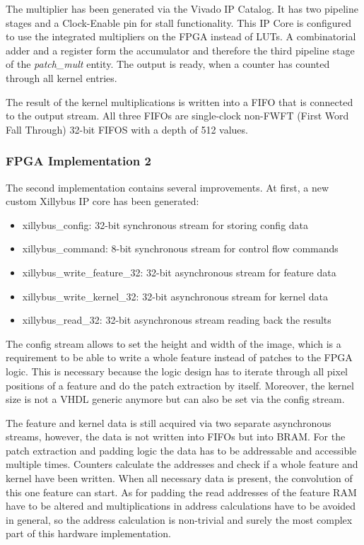 \documentclass[
			fontsize = 12pt,
			paper = a4
			]
			{scrartcl}%
\newcommand{\?}{\ensuremath{^\texttt{\textbf [CITATION~NEEDED]}}}
\begin{document}
The multiplier has been generated via the Vivado IP Catalog.
It has two pipeline stages and a Clock-Enable pin for stall functionality.
This IP Core is configured to use the integrated multipliers on the FPGA instead of LUTs.
A combinatorial adder and a register form the accumulator and therefore the third pipeline stage of the \emph{patch\_mult} entity.
The output is ready, when a counter has counted through all kernel entries.

The result of the kernel multiplications is written into a FIFO that is connected to the output stream.
All three FIFOs are single-clock non-FWFT (First Word Fall Through) 32-bit FIFOS with a depth of 512 values.

\subsubsection{FPGA Implementation 2}
\label{sec:fpgaimpl2}

The second implementation contains several improvements.
At first, a new custom Xillybus IP core has been generated:
\begin{itemize}
  \item xillybus\_config: 32-bit synchronous stream for storing config data
  \item xillybus\_command: 8-bit synchronous stream for control flow commands
  \item xillybus\_write\_feature\_32: 32-bit asynchronous stream for feature data
  \item xillybus\_write\_kernel\_32: 32-bit asynchronous stream for kernel data
  \item xillybus\_read\_32: 32-bit asynchronous stream reading back the results
\end{itemize}

The config stream allows to set the height and width of the image, which is a requirement to be able to write a whole feature instead of patches to the FPGA logic. This is necessary because the logic design has to iterate through all pixel positions of a feature and do the patch extraction by itself.
Moreover, the kernel size is not a VHDL generic anymore but can also be set via the config stream.

The feature and kernel data is still acquired via two separate asynchronous streams, however, the data is not written into FIFOs but into BRAM.
For the patch extraction and padding logic the data has to be addressable and accessible multiple times.
Counters calculate the addresses and check if a whole feature and kernel have been written. When all necessary data is present, the convolution of this one feature can start.
As for padding the read addresses of the feature RAM have to be altered and multiplications in address calculations have to be avoided in general, so the address calculation is non-trivial and surely the most complex part of this hardware implementation.
\end{document}
